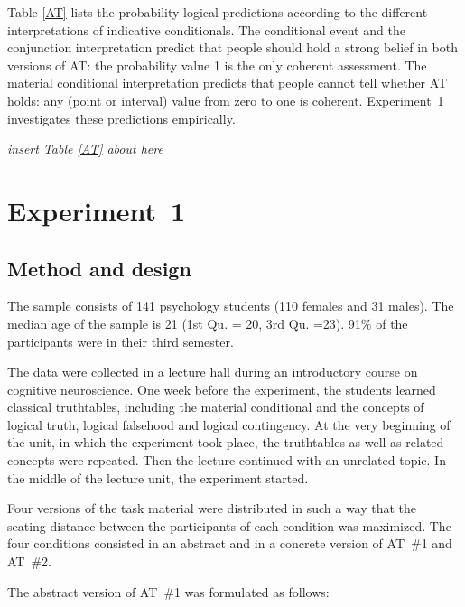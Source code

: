\documentclass[11pt]{article}
\begin{document}
 Table \ref{AT} lists the probability logical predictions
according to the different interpretations of indicative conditionals.
The conditional event and the conjunction interpretation predict that
people should hold a strong belief in both versions of AT: the
probability value 1 is the only coherent assessment. The material
conditional interpretation predicts that people cannot tell whether AT
holds: any (point or interval) value from zero to one is
coherent. Experiment~1 investigates these predictions empirically.


\dotfill

\dotfill \emph{insert Table
\ref{AT} about here} \dotfill

\dotfill






\section{Experiment~1}
\subsection{Method and design}
The sample consists of 141 psychology students (110 females and 31
males). The median age of the sample is 21 (1st Qu. = 20, 3rd
Qu. =23).  91\% of the participants were in their third semester.

The data were collected in a lecture hall during an introductory
course on cognitive neuroscience. One week before the experiment, the
students learned classical truthtables, including the material
conditional and the concepts of logical truth, logical falsehood and
logical contingency. At the very beginning of the unit, in which the
experiment took place, the truthtables as well as related concepts were
repeated. Then the lecture continued with an unrelated topic. In
the middle of the lecture unit, the experiment started.

Four versions of the task material were distributed in such a way that the
seating-distance between the participants of each condition was
maximized. The four conditions consisted in an abstract and in a concrete
 version of AT~\#1 and AT~\#2.

The abstract version of AT~\#1 was formulated as follows:
\end{document}
